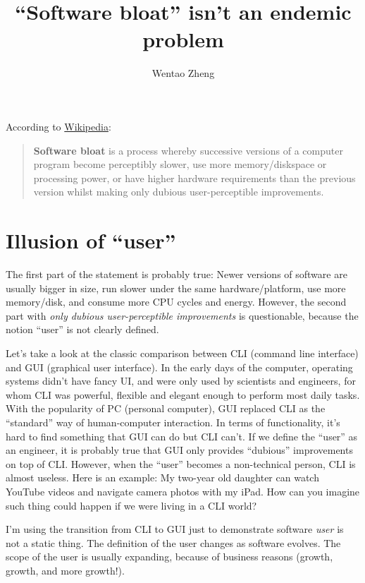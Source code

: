 \documentclass[a4paper, 11pt]{article}
\begin{document}
\title{``Software bloat'' isn't an endemic problem}
\author{Wentao Zheng}
\maketitle
\thispagestyle{empty}
\pagestyle{empty}

According to
\href{http://en.wikipedia.org/wiki/Software_bloat}{Wikipedia}:
\begin{quote}
  \textbf{Software bloat} is a process whereby successive versions of
  a computer program become perceptibly slower, use more
  memory/diskspace or processing power, or have higher hardware
  requirements than the previous version whilst making only dubious
  user-perceptible improvements.
\end{quote}

\section*{Illusion of ``user''}

The first part of the statement is probably true: Newer versions of
software are usually bigger in size, run slower under the same
hardware/platform, use more memory/disk, and consume more CPU cycles
and energy. However, the second part with \emph{only dubious
  user-perceptible improvements} is questionable, because the notion
``user'' is not clearly defined.

Let's take a look at the classic comparison between CLI (command line
interface) and GUI (graphical user interface). In the early days of
the computer, operating systems didn't have fancy UI, and were only
used by scientists and engineers, for whom CLI was powerful, flexible
and elegant enough to perform most daily tasks. With the popularity of
PC (personal computer), GUI replaced CLI as the ``standard'' way of
human-computer interaction. In terms of functionality, it's hard to
find something that GUI can do but CLI can't. If we define the
``user'' as an engineer, it is probably true that GUI only provides
``dubious'' improvements on top of CLI. However, when the ``user''
becomes a non-technical person, CLI is almost useless. Here is an
example: My two-year old daughter can watch YouTube videos and
navigate camera photos with my iPad. How can you imagine such thing
could happen if we were living in a CLI world?

I'm using the transition from CLI to GUI just to demonstrate software
\emph{user} is not a static thing. The definition of the user changes
as software evolves. The scope of the user is usually expanding,
because of business reasons (growth, growth, and more growth!).
\end{document}
